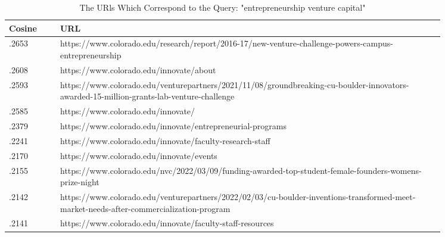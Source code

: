 \begin{table}[h]
\centering
\begin{tabular}{|p{0.1\linewidth} | p{0.75\linewidth}|}
\hline
\textbf{Cosine}  & \textbf{URL} \\ \hline
.2653        & https://www.colorado.edu/research/report/2016-17/new-venture-challenge-powers-campus-entrepreneurship \\ \hline
.2608        & https://www.colorado.edu/innovate/about \\ \hline
.2593        & https://www.colorado.edu/venturepartners/2021/11/08/groundbreaking-cu-boulder-innovators-awarded-15-million-grants-lab-venture-challenge  \\ \hline
.2585        & https://www.colorado.edu/innovate/  \\ \hline
.2379        & https://www.colorado.edu/innovate/entrepreneurial-programs  \\ \hline
.2241        & https://www.colorado.edu/innovate/faculty-research-staff \\ \hline
.2170        & https://www.colorado.edu/innovate/events  \\ \hline
.2155        & https://www.colorado.edu/nvc/2022/03/09/funding-awarded-top-student-female-founders-womens-prize-night  \\ \hline
.2142        & https://www.colorado.edu/venturepartners/2022/02/03/cu-boulder-inventions-transformed-meet-market-needs-after-commercialization-program  \\ \hline
.2141        & https://www.colorado.edu/innovate/faculty-staff-resources  \\ \hline
\end{tabular}
\caption{The URls Which Correspond to the Query: "entrepreneurship venture capital"}
\label{table:queryentrepreneurshipappendix}
\end{table}


